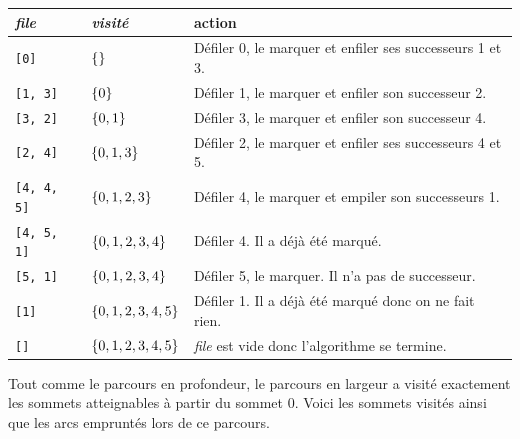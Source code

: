 \documentclass{magnolia}
\begin{document}
\begin{center}
\begin{tabular}{l|l|l}
\emph{file} & \emph{visité} & action\\
\hline
\verb_[0]_ & $\left\{\right\}$  & Défiler 0, le marquer et enfiler ses successeurs 1 et 3.\\
\verb_[1, 3]_ & $\left\{0\right\}$ & Défiler 1, le marquer et enfiler son successeur 2.\\
\verb_[3, 2]_ & $\left\{0, 1\right\}$ & Défiler 3, le marquer et enfiler son successeur 4.\\
\verb_[2, 4]_ & $\left\{0, 1, 3\right\}$ & Défiler 2, le marquer et enfiler ses successeurs 4 et 5.\\
\verb_[4, 4, 5]_ & $\left\{0, 1, 2, 3\right\}$ & Défiler 4, le marquer et empiler son successeurs 1.\\
\verb_[4, 5, 1]_ & $\left\{0, 1, 2, 3, 4\right\}$ & Défiler 4. Il a déjà été marqué.\\
\verb_[5, 1]_ & $\left\{0, 1, 2, 3, 4\right\}$ & Défiler 5, le marquer. Il n'a pas de successeur.\\
\verb_[1]_ & $\left\{0, 1, 2, 3, 4, 5\right\}$ & Défiler 1. Il a déjà été marqué donc on ne fait rien.\\
\verb_[]_ & $\left\{0, 1, 2, 3, 4, 5\right\}$ & \emph{file} est vide donc l'algorithme se termine.
\end{tabular}
\end{center}

\noindent
Tout comme le parcours en profondeur, le parcours en largeur a visité exactement les
sommets atteignables à partir du sommet 0. Voici les sommets visités ainsi que les
arcs empruntés  lors de ce parcours.
\end{document}
